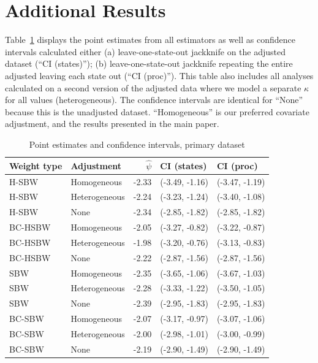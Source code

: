 \section{Additional Results}
\label{ssec:allresults}

Table~\ref{tab:confintmain} displays the point estimates from all estimators as well as confidence intervals calculated either (a) leave-one-state-out jackknife on the adjusted dataset (``CI (states)''); (b) leave-one-state-out jackknife repeating the entire adjusted leaving each state out (``CI (proc)''). This table also includes all analyses calculated on a second version of the adjusted data where we model a separate $\kappa$ for all values (heterogeneous). The confidence intervals are identical for ``None'' because this is the unadjusted dataset. ``Homogeneous'' is our preferred covariate adjustment, and the results presented in the main paper.

\begin{table}[h!]
\centering
\caption{Point estimates and confidence intervals, primary dataset}
\label{tab:confintmain}
\begin{tabular}{llrll}
  \hline
Weight type & Adjustment & $\hat{\psi}$ & CI (states) & CI (proc) \\ 
  \hline
H-SBW & Homogeneous & -2.33 & (-3.49, -1.16) & (-3.47, -1.19) \\ 
  H-SBW & Heterogeneous & -2.24 & (-3.23, -1.24) & (-3.40, -1.08) \\ 
  H-SBW & None & -2.34 & (-2.85, -1.82) & (-2.85, -1.82) \\ 
  BC-HSBW & Homogeneous & -2.05 & (-3.27, -0.82) & (-3.22, -0.87) \\ 
  BC-HSBW & Heterogeneous & -1.98 & (-3.20, -0.76) & (-3.13, -0.83) \\ 
  BC-HSBW & None & -2.22 & (-2.87, -1.56) & (-2.87, -1.56) \\ 
  SBW & Homogeneous & -2.35 & (-3.65, -1.06) & (-3.67, -1.03) \\ 
  SBW & Heterogeneous & -2.28 & (-3.33, -1.22) & (-3.50, -1.05) \\ 
  SBW & None & -2.39 & (-2.95, -1.83) & (-2.95, -1.83) \\ 
  BC-SBW & Homogeneous & -2.07 & (-3.17, -0.97) & (-3.07, -1.06) \\ 
  BC-SBW & Heterogeneous & -2.00 & (-2.98, -1.01) & (-3.00, -0.99) \\ 
  BC-SBW & None & -2.19 & (-2.90, -1.49) & (-2.90, -1.49) \\ 
   \hline
\end{tabular}
\end{table}

